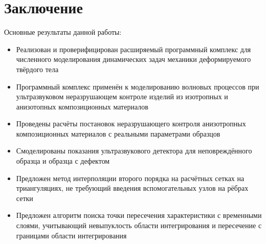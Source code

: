\section{Заключение}
Основные результаты данной работы:
\begin{itemize}
\item Реализован и проверифицирован расширяемый программный комплекс для численного моделирования динамических задач механики деформируемого твёрдого тела
\item Программный комплекс применён к моделированию волновых процессов при ультразвуковом неразрушающем контроле изделий из изотропных и анизотопных композиционных материалов
\item Проведены расчёты постановок неразрушающего контроля анизотропных композиционных материалов с реальными параметрами образцов
\item Смоделированы показания ультразвукового детектора для неповреждённого образца и образца с дефектом
\item Предложен метод интерполяции второго порядка на расчётных сетках на триангуляциях, не требующий введения вспомогательных узлов на рёбрах сетки
\item Предложен алгоритм поиска точки пересечения характеристики с временными слоями, учитывающий невыпуклость области интегрирования и пересечение с границами области интегрирования
\end{itemize}
